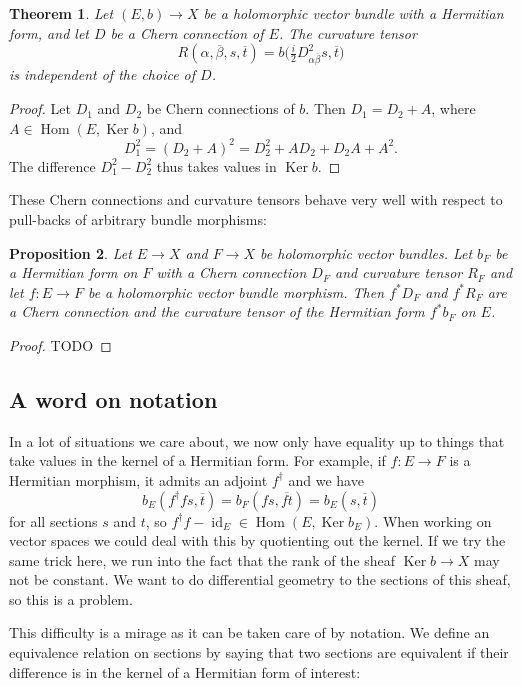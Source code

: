 \documentclass[10pt,a4paper]{article}
\newtheorem{theo}{Theorem}[section]
\newtheorem{prop}[theo]{Proposition}
\newtheorem*{proof}{Proof}
\def\ov#1{\overline{#1}}
\DeclareMathOperator{\Ker}{Ker}
\DeclareMathOperator{\Hom}{Hom}
\DeclareMathOperator{\id}{id}
\begin{document}
\begin{theo}
Let $(E, b) \to X$ be a holomorphic vector bundle with a Hermitian form, and let $D$ be a Chern connection of $E$. The curvature tensor
\[
R(\alpha,\ov\beta,s, \ov t)
= b\bigl(\tfrac i2 D^2_{\alpha\ov\beta}s, \ov t\bigr)
\]
is independent of the choice of $D$.
\end{theo}


\begin{proof}
Let $D_1$ and $D_2$ be Chern connections of $b$. Then $D_1 = D_2 + A$, where $A \in \Hom(E, \Ker b)$, and
\[
D_1^2
= (D_2 + A)^2
= D_2^2 + A D_2 + D_2 A + A^2.
\]
The difference $D_1^2 - D_2^2$ thus takes values in $\Ker b$.
\end{proof}



These Chern connections and curvature tensors behave very well with respect to
pull-backs of arbitrary bundle morphisms:


\begin{prop}
Let $E \to X$ and $F \to X$ be holomorphic vector bundles. Let $b_F$ be a
Hermitian form on $F$ with a Chern connection $D_F$ and curvature tensor $R_F$
and let $f : E \to F$ be a holomorphic vector bundle morphism.
Then $f^*D_F$ and $f^*R_F$ are a Chern connection and the curvature tensor of
the Hermitian form $f^*b_F$ on $E$.
\end{prop}

\begin{proof}
    TODO
\end{proof}


\subsection{A word on notation}


In a lot of situations we care about, we now only have equality up to things that take values in the kernel of a Hermitian form. For example, if $f : E \to F$ is a Hermitian morphism, it admits an adjoint $f^\dagger$ and we have
\[
b_E(f^\dagger f s, \ov t)
= b_F(f s, \ov{f t})
= b_E(s, \ov t)
\]
for all sections $s$ and $t$,
so $f^\dagger f - \id_E \in \Hom(E, \Ker b_E)$. When working on vector spaces we could deal with this by quotienting out the kernel. If we try the same trick here, we run into the fact that the rank of the sheaf $\Ker b \to X$ may not be constant. We want to do differential geometry to the sections of this sheaf, so this is a problem.

This difficulty is a mirage as it can be taken care of by notation. We define an equivalence relation on sections by saying that two sections are equivalent if their difference is in the kernel of a Hermitian form of interest:
\end{document}
